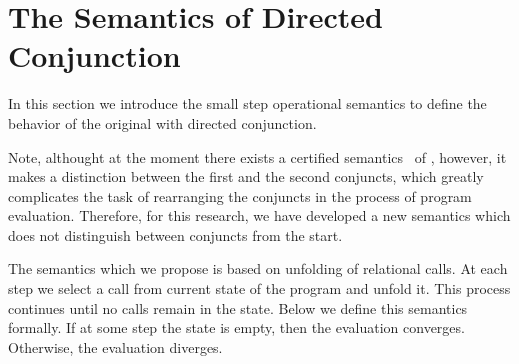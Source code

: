 \section{The Semantics of Directed Conjunction}
In this section we introduce the small step operational semantics to define the behavior of the original \mk with directed conjunction. 


Note, althought at the moment there exists a certified semantics~\cite{fair:semantics} of \mk, however, it makes a distinction between the first
and the second conjuncts, which greatly complicates the task of rearranging the conjuncts in the process of program evaluation. 
Therefore, for this research, we have developed a new semantics which does not distinguish between conjuncts from the start.


The semantics which we propose is based on unfolding of relational calls. At each step we select a call from current state of the program and unfold it.
This process continues until no calls remain in the state. Below we define this semantics formally. If at some step the state is empty, then the evaluation converges. Otherwise, the evaluation diverges.



